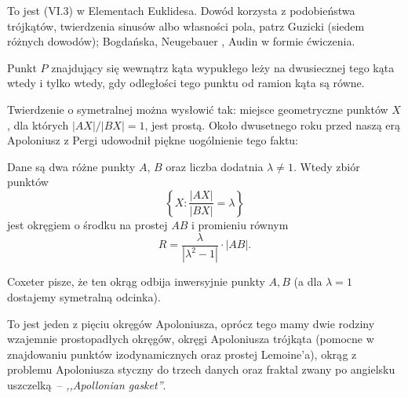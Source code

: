 To jest (VI.3) w Elementach Euklidesa.
Dowód korzysta z podobieństwa trójkątów, twierdzenia sinusów albo własności pola, patrz Guzicki \cite[s. 120]{guzicki_2021} (siedem różnych dowodów); Bogdańska, Neugebauer \cite[s. 73]{neugebauer_2018}, Audin \cite[s. 102]{audin_2003} w formie ćwiczenia.

\begin{proposition} %
	Punkt $P$ znajdujący się wewnątrz kąta wypukłego leży na dwusiecznej tego kąta wtedy i tylko wtedy, gdy odległości tego punktu od ramion kąta są równe.
\end{proposition}




Twierdzenie o symetralnej %
można wysłowić tak: miejsce geometryczne punktów $X$, dla których $|AX|/|BX| = 1$, jest prostą.
Około dwusetnego roku przed naszą erą Apoloniusz z Pergi udowodnił piękne uogólnienie tego faktu:

\begin{definition} %
	Dane są dwa różne punkty $A$, $B$ oraz liczba dodatnia $\lambda \neq 1$.
	Wtedy zbiór punktów 
	\begin{equation}
		\left\{X : \frac{|AX|}{|BX|} = \lambda \right\}
	\end{equation}
	jest okręgiem o środku na prostej $AB$ i promieniu równym
	\begin{equation}
		R = \frac{\lambda}{|\lambda^2 - 1|} \cdot |AB|.
	\end{equation}
\end{definition}

Coxeter \cite[s. 104, 105]{coxeter_1967} pisze, że ten okrąg odbija inwersyjnie punkty $A, B$ (a dla $\lambda = 1$ dostajemy symetralną odcinka).

To jest jeden z pięciu okręgów Apoloniusza, oprócz tego mamy dwie rodziny wzajemnie prostopadłych okręgów, okręgi Apoloniusza trójkąta (pomocne w znajdowaniu punktów izodynamicznych oraz prostej Lemoine'a), okrąg z problemu Apoloniusza styczny do trzech danych oraz fraktal zwany po angielsku uszczelką -- \emph{,,Apollonian gasket''}.


